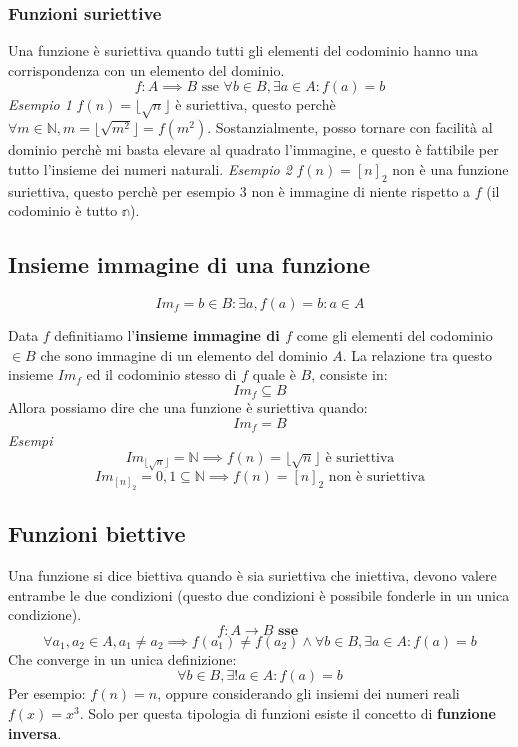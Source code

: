 \documentclass{article}
\begin{document}
\subsubsection{Funzioni suriettive}
Una funzione è suriettiva quando tutti gli elementi del codominio hanno una corrispondenza con un elemento del dominio.
$$f:A\implies B\text{ sse } \forall b\in B, \exists a \in A : f(a)=b$$
\noindent
\textit{Esempio 1}
\newline
$f(n)=\lfloor\sqrt{n}\rfloor$ è suriettiva, questo perchè $\forall m\in \mathbb{N}, m=\lfloor\sqrt{m^2}\rfloor=f(m^2)$. Sostanzialmente, posso tornare con facilità al dominio perchè mi basta elevare al quadrato l'immagine, e questo è fattibile per tutto l'insieme dei numeri naturali.
\noindent
\newline
\linebreak
\textit{Esempio 2}
\newline
$f(n)=[n]_2$ non è una funzione suriettiva, questo perchè per esempio $3$ non è immagine di niente rispetto a $f$ (il codominio è tutto $\mathbb{n}$).

\subsection{Insieme immagine di una funzione}
$$Im_f={b\in B:\exists a,f(a)=b}:a\in A$$

Data $f$ definitiamo l'\textbf{insieme immagine di $f$} come gli elementi del codominio $\in B$ che sono immagine di un elemento del dominio $A$.
\newline
La relazione tra questo insieme $Im_f$ ed il codominio stesso di $f$ quale è $B$, consiste in:
$$Im_f\subseteq B$$
Allora possiamo dire che una funzione è suriettiva quando:
$$Im_f=B$$
\newline
\textit{Esempi}
$$Im_{\lfloor\sqrt{n}\rfloor}=\mathbb{N}\implies f(n)=\lfloor\sqrt{n}\rfloor \text{ è suriettiva}$$
$$Im_{[n]_2}={0,1}\subseteq \mathbb{N} \implies f(n)=[n]_2 \text{ non è suriettiva}$$

\subsection{Funzioni biettive}
Una funzione si dice biettiva quando è sia suriettiva che iniettiva, devono valere entrambe le due condizioni (questo due condizioni è possibile fonderle in un unica condizione).
$$f:A\rightarrow B \textbf{ sse }$$
$$\forall a_1,a_2 \in A, a_1\neq a_2 \implies f(a_1)\neq f(a_2) \land \forall b\in B, \exists a\in A:f(a)=b$$
Che converge in un unica definizione:
$$\forall b \in B,\exists !a\in A : f(a)=b$$
Per esempio: $f(n)=n$, oppure considerando gli insiemi dei numeri reali $f(x)=x^3$. Solo per questa tipologia di funzioni esiste il concetto di \textbf{funzione inversa}.
\end{document}
